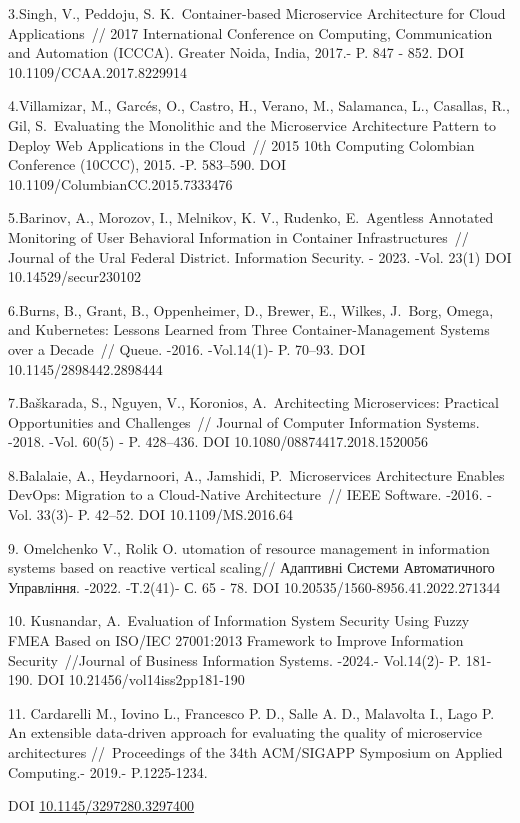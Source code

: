 \documentclass[
]{article}
\begin{document}
3.Singh, V., Peddoju, S. K.~Container-based Microservice Architecture
for Cloud Applications~// 2017 International Conference on Computing,
Communication and Automation (ICCCA). Greater Noida, India, 2017.- P.
847 - 852. DOI 10.1109/CCAA.2017.8229914

4.Villamizar, M., Garcés, O., Castro, H., Verano, M., Salamanca, L.,
Casallas, R., Gil, S.~Evaluating the Monolithic and the Microservice
Architecture Pattern to Deploy Web Applications in the Cloud~// 2015
10th Computing Colombian Conference (10CCC), 2015. -P. 583--590. DOI
10.1109/ColumbianCC.2015.7333476

5.Barinov, A., Morozov, I., Melnikov, K. V., Rudenko, E.~Agentless
Annotated Monitoring of User Behavioral Information in Container
Infrastructures~// Journal of the Ural Federal District. Information
Security. - 2023. -Vol. 23(1) DOI 10.14529/secur230102

6.Burns, B., Grant, B., Oppenheimer, D., Brewer, E., Wilkes, J.~Borg,
Omega, and Kubernetes: Lessons Learned from Three Container-Management
Systems over a Decade~// Queue. -2016. -Vol.14(1)- P. 70--93. DOI
10.1145/2898442.2898444

7.Baškarada, S., Nguyen, V., Koronios, A.~Architecting Microservices:
Practical Opportunities and Challenges~// Journal of Computer
Information Systems. -2018. -Vol. 60(5) - P. 428--436. DOI
10.1080/08874417.2018.1520056

8.Balalaie, A., Heydarnoori, A., Jamshidi, P.~Microservices Architecture
Enables DevOps: Migration to a Cloud-Native Architecture~// IEEE
Software. -2016. -Vol. 33(3)- P. 42--52. DOI 10.1109/MS.2016.64

9. Omelchenko V., Rolik O. utomation of resource management in
information systems based on reactive vertical scaling// Адаптивні
Системи Автоматичного Управління. -2022. -Т.2(41)- С. 65 - 78. DOI
10.20535/1560-8956.41.2022.271344

10. Kusnandar, A.~Evaluation of Information System Security Using Fuzzy
FMEA Based on ISO/IEC 27001:2013 Framework to Improve Information
Security~//Journal of Business Information Systems. -2024.- Vol.14(2)-
P. 181- 190. DOI 10.21456/vol14iss2pp181-190

11. Cardarelli M., Iovino L., Francesco P. D., Salle A. D., Malavolta
I., Lago P. An extensible data-driven approach for evaluating the
quality of microservice architectures //~Proceedings of the 34th
ACM/SIGAPP Symposium on Applied Computing.- 2019.- P.1225-1234.

DOI
\href{https://doi.org/10.1145/3297280.3297400}{10.1145/3297280.3297400}
\end{document}

